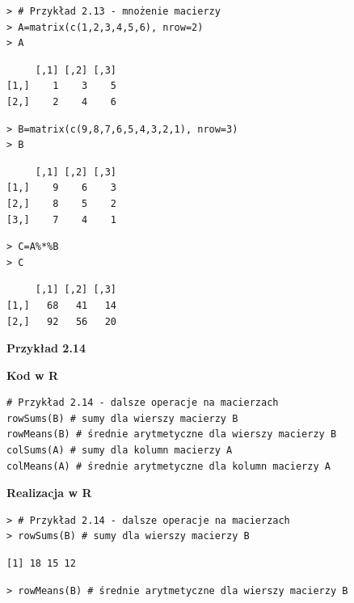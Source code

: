 \documentclass[12pt,B5paper,]{book}
\begin{document}
\begin{verbatim}
> # Przykład 2.13 - mnożenie macierzy
> A=matrix(c(1,2,3,4,5,6), nrow=2)
> A
\end{verbatim}

\begin{verbatim}
     [,1] [,2] [,3]
[1,]    1    3    5
[2,]    2    4    6
\end{verbatim}

\begin{verbatim}
> B=matrix(c(9,8,7,6,5,4,3,2,1), nrow=3)
> B
\end{verbatim}

\begin{verbatim}
     [,1] [,2] [,3]
[1,]    9    6    3
[2,]    8    5    2
[3,]    7    4    1
\end{verbatim}

\begin{verbatim}
> C=A%*%B 
> C
\end{verbatim}

\begin{verbatim}
     [,1] [,2] [,3]
[1,]   68   41   14
[2,]   92   56   20
\end{verbatim}

\vspace{0.8cm}

\textbf{Przykład 2.14}

\textbf{Kod w R}

\begin{verbatim}
# Przykład 2.14 - dalsze operacje na macierzach
rowSums(B) # sumy dla wierszy macierzy B
rowMeans(B) # średnie arytmetyczne dla wierszy macierzy B
colSums(A) # sumy dla kolumn macierzy A
colMeans(A) # średnie arytmetyczne dla kolumn macierzy A
\end{verbatim}

\vspace{0.8cm}

\textbf{Realizacja w R}

\begin{verbatim}
> # Przykład 2.14 - dalsze operacje na macierzach
> rowSums(B) # sumy dla wierszy macierzy B
\end{verbatim}

\begin{verbatim}
[1] 18 15 12
\end{verbatim}

\begin{verbatim}
> rowMeans(B) # średnie arytmetyczne dla wierszy macierzy B
\end{verbatim}
\end{document}
